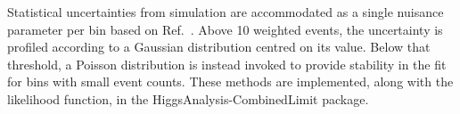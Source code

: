 Statistical uncertainties from simulation are accommodated as a single nuisance parameter per bin based on Ref.~. Above 10 weighted events, the uncertainty is profiled according to a Gaussian distribution centred on its value. Below that threshold, a Poisson distribution is instead invoked to provide stability in the fit for bins with small event counts. These methods are implemented, along with the likelihood function, in the \textsf{HiggsAnalysis-CombinedLimit} package.


